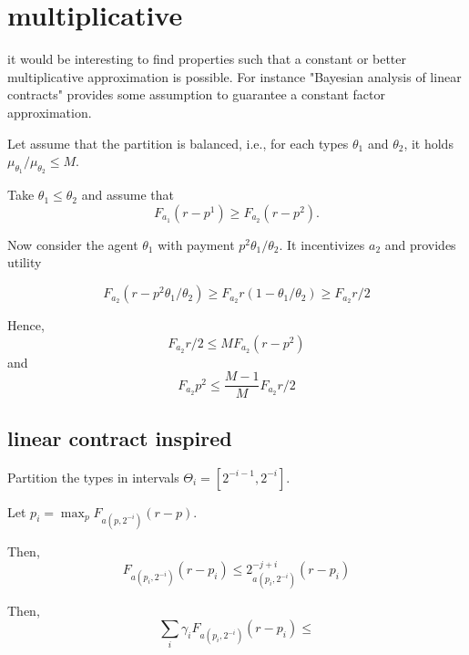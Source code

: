 \section{multiplicative}
it would be interesting to find properties such that a constant or better multiplicative approximation is possible.
For instance "Bayesian analysis of linear contracts" provides some assumption to guarantee a constant factor approximation.

Let assume that the partition is balanced, i.e., for each types $\theta_1$ and $\theta_2$, it holds $\mu_{\theta_1}/\mu_{\theta_2}\le M$.

Take $\theta_1\le \theta_2$ and assume that 
\[ F_{a_1} (r-p^1) \ge F_{a_2} (r-p^2).\]

Now consider the agent $\theta_1$ with payment $p^2 \theta_1/\theta_2$.
It incentivizes $a_2$ and provides utility

\[F_{a_2} (r-p^2 \theta_1/\theta_2)\ge F_{a_2} r(1-\theta_1/\theta_2)\ge F_{a_2} r/2 \]

Hence, 
\[ F_{a_2} r/2 \le M F_{a_2} (r-p^2) \]
and
\[F_{a_2} p^2 \le 	\frac{M-1}{M} F_{a_2} r/2  \]

\subsection{linear contract inspired}

Partition the types in intervals $\Theta_i=[2^{-i-1},2^{-i}]$.

Let $p_i= \max_p F_{a(p,2^{-i})} (r-p)$. 

Then, 
\[F_{a(p_i,2^{-i})} (r-p_i)\le 2^{-j+ i} _{a(p_i,2^{-i})} (r-p_i) \]


Then,
\[ \sum_i \gamma_i F_{a(p_i,2^{-i})} (r-p_i) \le   \]
